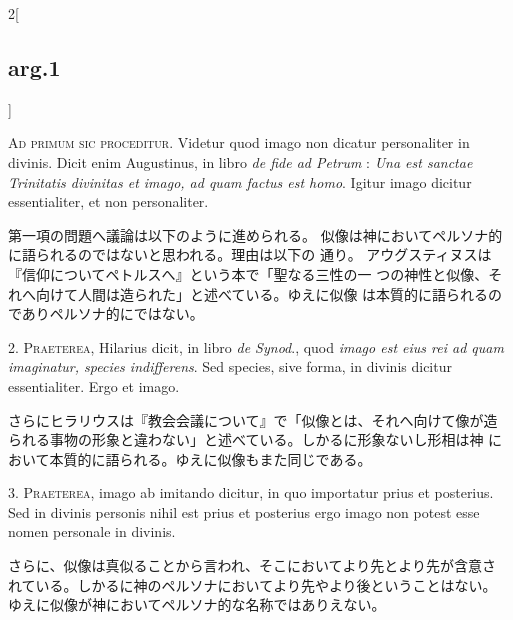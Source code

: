 \documentclass[paper=a4paper,fontsize=10pt,jafontsize=9pt,titlepage]{jlreq}
\begin{document}
\begin{paracol}{2}[\subsection{arg.1}]

{\scshape Ad primum sic proceditur}. Videtur quod imago non dicatur personaliter
in divinis. Dicit enim Augustinus, in libro {\itshape de fide ad
 Petrum} : {\itshape Una est
sanctae Trinitatis divinitas et imago, ad quam factus est homo}. Igitur
imago dicitur essentialiter, et non personaliter.

\switchcolumn

第一項の問題へ議論は以下のように進められる。
似像は神においてペルソナ的に語られるのではないと思われる。理由は以下の
 通り。
アウグスティヌスは『信仰についてペトルスへ』という本で「聖なる三性の一
 つの神性と似像、それへ向けて人間は造られた」と述べている。ゆえに似像
 は本質的に語られるのでありペルソナ的にではない。


2. {\scshape Praeterea}, Hilarius dicit, in libro {\itshape de Synod}., quod {\itshape imago est eius rei
ad quam imaginatur, species indifferens}. Sed species, sive forma, in
divinis dicitur essentialiter. Ergo et imago.

\switchcolumn

さらにヒラリウスは『教会会議について』で「似像とは、それへ向けて像が造
 られる事物の形象と違わない」と述べている。しかるに形象ないし形相は神
 において本質的に語られる。ゆえに似像もまた同じである。


3. {\scshape Praeterea}, imago ab imitando dicitur, in quo importatur prius et
posterius. Sed in divinis personis nihil est prius et posterius ergo
imago non potest esse nomen personale in divinis.

\switchcolumn

さらに、似像は真似ることから言われ、そこにおいてより先とより先が含意さ
 れている。しかるに神のペルソナにおいてより先やより後ということはない。
 ゆえに似像が神においてペルソナ的な名称ではありえない。

\switchcolumn*[\subsection{s.c.}]


\end{paracol}
\end{document}
